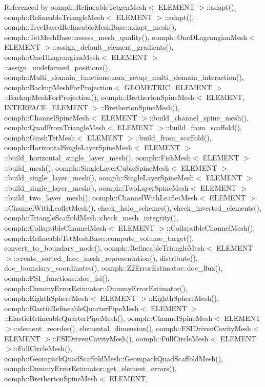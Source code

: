 Referenced by oomph\+::\+Refineable\+Tetgen\+Mesh$<$ E\+L\+E\+M\+E\+N\+T $>$\+::adapt(), oomph\+::\+Refineable\+Triangle\+Mesh$<$ E\+L\+E\+M\+E\+N\+T $>$\+::adapt(), oomph\+::\+Tree\+Based\+Refineable\+Mesh\+Base\+::adapt\+\_\+mesh(), oomph\+::\+Tet\+Mesh\+Base\+::assess\+\_\+mesh\+\_\+quality(), oomph\+::\+One\+D\+Lagrangian\+Mesh$<$ E\+L\+E\+M\+E\+N\+T $>$\+::assign\+\_\+default\+\_\+element\+\_\+gradients(), oomph\+::\+One\+D\+Lagrangian\+Mesh$<$ E\+L\+E\+M\+E\+N\+T $>$\+::assign\+\_\+undeformed\+\_\+positions(), oomph\+::\+Multi\+\_\+domain\+\_\+functions\+::aux\+\_\+setup\+\_\+multi\+\_\+domain\+\_\+interaction(), oomph\+::\+Backup\+Mesh\+For\+Projection$<$ G\+E\+O\+M\+E\+T\+R\+I\+C\+\_\+\+E\+L\+E\+M\+E\+N\+T $>$\+::\+Backup\+Mesh\+For\+Projection(), oomph\+::\+Bretherton\+Spine\+Mesh$<$ E\+L\+E\+M\+E\+N\+T, I\+N\+T\+E\+R\+F\+A\+C\+E\+\_\+\+E\+L\+E\+M\+E\+N\+T $>$\+::\+Bretherton\+Spine\+Mesh(), oomph\+::\+Channel\+Spine\+Mesh$<$ E\+L\+E\+M\+E\+N\+T $>$\+::build\+\_\+channel\+\_\+spine\+\_\+mesh(), oomph\+::\+Quad\+From\+Triangle\+Mesh$<$ E\+L\+E\+M\+E\+N\+T $>$\+::build\+\_\+from\+\_\+scaffold(), oomph\+::\+Gmsh\+Tet\+Mesh$<$ E\+L\+E\+M\+E\+N\+T $>$\+::build\+\_\+from\+\_\+scaffold(), oomph\+::\+Horizontal\+Single\+Layer\+Spine\+Mesh$<$ E\+L\+E\+M\+E\+N\+T $>$\+::build\+\_\+horizontal\+\_\+single\+\_\+layer\+\_\+mesh(), oomph\+::\+Fish\+Mesh$<$ E\+L\+E\+M\+E\+N\+T $>$\+::build\+\_\+mesh(), oomph\+::\+Single\+Layer\+Cubic\+Spine\+Mesh$<$ E\+L\+E\+M\+E\+N\+T $>$\+::build\+\_\+single\+\_\+layer\+\_\+mesh(), oomph\+::\+Single\+Layer\+Spine\+Mesh$<$ E\+L\+E\+M\+E\+N\+T $>$\+::build\+\_\+single\+\_\+layer\+\_\+mesh(), oomph\+::\+Two\+Layer\+Spine\+Mesh$<$ E\+L\+E\+M\+E\+N\+T $>$\+::build\+\_\+two\+\_\+layer\+\_\+mesh(), oomph\+::\+Channel\+With\+Leaflet\+Mesh$<$ E\+L\+E\+M\+E\+N\+T $>$\+::\+Channel\+With\+Leaflet\+Mesh(), check\+\_\+halo\+\_\+schemes(), check\+\_\+inverted\+\_\+elements(), oomph\+::\+Triangle\+Scaffold\+Mesh\+::check\+\_\+mesh\+\_\+integrity(), oomph\+::\+Collapsible\+Channel\+Mesh$<$ E\+L\+E\+M\+E\+N\+T $>$\+::\+Collapsible\+Channel\+Mesh(), oomph\+::\+Refineable\+Tet\+Mesh\+Base\+::compute\+\_\+volume\+\_\+target(), convert\+\_\+to\+\_\+boundary\+\_\+node(), oomph\+::\+Refineable\+Triangle\+Mesh$<$ E\+L\+E\+M\+E\+N\+T $>$\+::create\+\_\+sorted\+\_\+face\+\_\+mesh\+\_\+representation(), distribute(), doc\+\_\+boundary\+\_\+coordinates(), oomph\+::\+Z2\+Error\+Estimator\+::doc\+\_\+flux(), oomph\+::\+F\+S\+I\+\_\+functions\+::doc\+\_\+fsi(), oomph\+::\+Dummy\+Error\+Estimator\+::\+Dummy\+Error\+Estimator(), oomph\+::\+Eighth\+Sphere\+Mesh$<$ E\+L\+E\+M\+E\+N\+T $>$\+::\+Eighth\+Sphere\+Mesh(), oomph\+::\+Elastic\+Refineable\+Quarter\+Pipe\+Mesh$<$ E\+L\+E\+M\+E\+N\+T $>$\+::\+Elastic\+Refineable\+Quarter\+Pipe\+Mesh(), oomph\+::\+Channel\+Spine\+Mesh$<$ E\+L\+E\+M\+E\+N\+T $>$\+::element\+\_\+reorder(), elemental\+\_\+dimension(), oomph\+::\+F\+S\+I\+Driven\+Cavity\+Mesh$<$ E\+L\+E\+M\+E\+N\+T $>$\+::\+F\+S\+I\+Driven\+Cavity\+Mesh(), oomph\+::\+Full\+Circle\+Mesh$<$ E\+L\+E\+M\+E\+N\+T $>$\+::\+Full\+Circle\+Mesh(), oomph\+::\+Geompack\+Quad\+Scaffold\+Mesh\+::\+Geompack\+Quad\+Scaffold\+Mesh(), oomph\+::\+Dummy\+Error\+Estimator\+::get\+\_\+element\+\_\+errors(), oomph\+::\+Bretherton\+Spine\+Mesh$<$ E\+L\+E\+M\+E\+N\+T, 